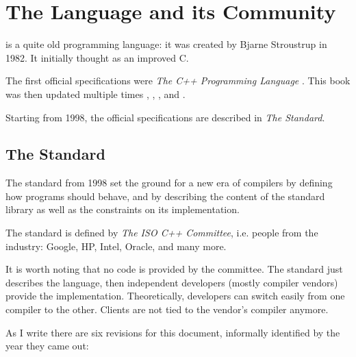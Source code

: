 \chapter{The \Cpp{} Language and its Community}

\Cpp is a quite old programming language: it was created by Bjarne Stroustrup
in 1982. It initially thought as an improved C.

The first official specifications were \emph{The C++ Programming
  Language} \cite{the-cpp-programming-language-1st}. This book was
then updated multiple times \cite{the-cpp-programming-language-2nd},
\cite{the-cpp-programming-language-3rd},
\cite{the-cpp-programming-language-se}, and
\cite{the-cpp-programming-language-4th}.

Starting from 1998, the official specifications are described in
\emph{The Standard}.

\section{The Standard}

The standard from 1998 set the ground for a new era of compilers by
defining how \cpp{} programs should behave, and by describing the
content of the standard library as well as the constraints on its
implementation.

The standard is defined by {\em The ISO C++ Committee}, i.e. people
from the industry: Google, HP, Intel, Oracle, and many more.

It is worth noting that no code is provided by the committee. The
standard just describes the language, then independent developers
(mostly compiler vendors) provide the implementation. Theoretically,
developers can switch easily from one compiler to the other. Clients
are not tied to the vendor's compiler anymore.

As I write there are six revisions for this document, informally
identified by the year they came out:

